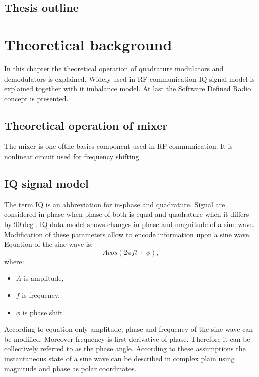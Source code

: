 \documentclass[en,printmode]{mgr}
\begin{document}
	\section{Thesis outline}
	
\chapter{Theoretical background}
	In this chapter the theoretical operation of quadrature modulators and demodulators is explained. Widely
		used in RF communication IQ signal model is explained together with it imbalance model. At last the
	Software Defined Radio concept is presented.
	\section{Theoretical operation of mixer}
		The mixer is one ofthe basics component used in RF communication. It is nonlinear circuit used for
		frequency shifting.
	\section{IQ signal model}
			The term IQ is an abbreviation for in-phase and quadrature. Signal are considered in-phase when phase
		of both is equal and quadrature when it differs by 90$\deg$. IQ data model shows changes in phase and
		magnitude of a sine wave. Modification of these parameters allow to encode information upon a sine wave.
		\\
		
		\noindent				
		Equation of the sine wave is:
		\[
			A cos\left(2\pi f t+ \phi\right), \label{eq:sinewave}
		\]
		where:
		\begin{itemize}
			\item $A$ is amplitude,
			\item $f$ is frequency,
			\item $\phi$ is phase shift
		\end{itemize}
		
		According to equation \label{eq:sinewave} only amplitude, phase and frequency of the sine wave can be
		modified. Moreover frequency is first derivative of phase. Therefore it can be collectively referred to 
		as the phase angle. According to these assumptions the instantaneous state of a sine wave can be described
		in complex plain using magnitude and phase as polar coordinates.
		
\end{document}

